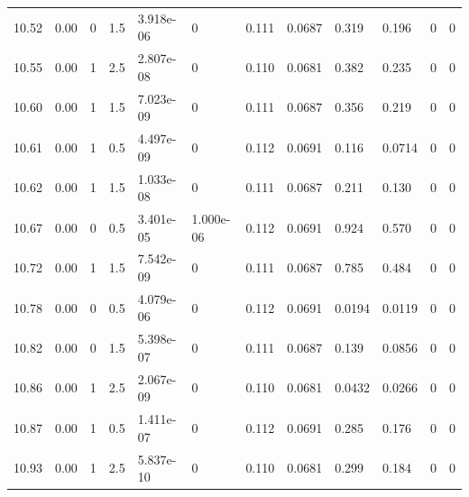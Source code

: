 \documentclass[preview]{standalone}
\begin{document}
{{{{{{\begin{tabular}{L{1.2cm}C{1.2cm} C{0.3cm}C{0.5cm} C{1.4cm}C{1.4cm} C{1.4cm}C{1.4cm} C{1.6cm}C{1.6cm} C{1.6cm}C{1.6cm}}
  10.52  &  0.00  & 0     & 1.5 &  3.918e-06  & 0  &  0.111&   0.0687& 0.319 & 0.196   &  0 & 0  \\ 
  10.55  &  0.00  & 1     & 2.5 &  2.807e-08  & 0  &  0.110&   0.0681& 0.382 & 0.235   &  0 & 0  \\ 
  10.60  &  0.00  & 1     & 1.5 &  7.023e-09  & 0  &  0.111&   0.0687& 0.356 & 0.219   &  0 & 0  \\ 
  10.61  &  0.00  & 1     & 0.5 &  4.497e-09  & 0  &  0.112&   0.0691& 0.116 & 0.0714   &  0 & 0  \\ 
  10.62  &  0.00  & 1     & 1.5 &  1.033e-08  & 0  &  0.111&   0.0687& 0.211 & 0.130   &  0 & 0  \\ 
  10.67  &  0.00  & 0     & 0.5 &  3.401e-05  & 1.000e-06  &  0.112&   0.0691& 0.924 & 0.570   &  0 & 0  \\ 
  10.72  &  0.00  & 1     & 1.5 &  7.542e-09  & 0  &  0.111&   0.0687& 0.785 & 0.484   &  0 & 0  \\ 
  10.78  &  0.00  & 0     & 0.5 &  4.079e-06  & 0  &  0.112&   0.0691& 0.0194 & 0.0119   &  0 & 0  \\ 
  10.82  &  0.00  & 0     & 1.5 &  5.398e-07  & 0  &  0.111&   0.0687& 0.139 & 0.0856   &  0 & 0  \\ 
  10.86  &  0.00  & 1     & 2.5 &  2.067e-09  & 0  &  0.110&   0.0681& 0.0432 & 0.0266   &  0 & 0  \\ 
  10.87  &  0.00  & 1     & 0.5 &  1.411e-07  & 0  &  0.112&   0.0691& 0.285 & 0.176   &  0 & 0  \\ 
  10.93  &  0.00  & 1     & 2.5 &  5.837e-10  & 0  &  0.110&   0.0681& 0.299 & 0.184   &  0 & 0  \\ 
\hline 
\end{tabular} 

}}}}}}
\end{document}
